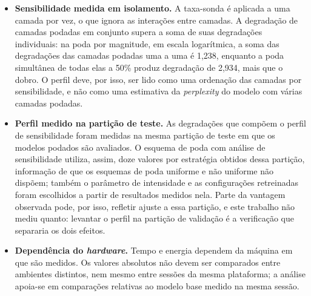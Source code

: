 \begin{itemize}
    \item \textbf{Sensibilidade medida em isolamento.} A taxa-sonda é aplicada a uma camada
          por vez, o que ignora as interações entre camadas. A degradação de camadas
          podadas em conjunto
          supera a soma de suas degradações individuais: na poda por magnitude, em escala
          logarítmica, a soma das degradações das camadas podadas uma a uma é 1,238,
          enquanto a poda simultânea de todas elas a 50\% produz degradação de 2,934, mais
          que o dobro. O perfil deve, por isso, ser lido como uma ordenação das camadas por
          sensibilidade, e não como uma estimativa da \textit{perplexity} do modelo com
          várias camadas podadas.

    \item \textbf{Perfil medido na partição de teste.} As degradações que compõem o perfil de
          sensibilidade foram medidas na mesma partição de teste em que os modelos podados
          são avaliados. O esquema de poda com análise de
          sensibilidade utiliza, assim, doze valores por estratégia obtidos dessa partição,
          informação de que os esquemas de poda uniforme e não uniforme não dispõem; também
          o parâmetro de intensidade e as configurações retreinadas foram escolhidos a
          partir de resultados medidos nela.
          Parte da vantagem observada pode, por isso,
          refletir ajuste a essa partição, e este trabalho não mediu quanto: levantar o
          perfil na partição de validação é a verificação que separaria os dois efeitos.

    \item \textbf{Dependência do \textit{hardware}.} Tempo e energia dependem da máquina em
          que são medidos. Os valores absolutos não devem ser comparados entre ambientes
          distintos, nem mesmo entre sessões da mesma plataforma; a análise apoia-se em
          comparações relativas ao modelo base medido na mesma sessão.


\end{itemize}
